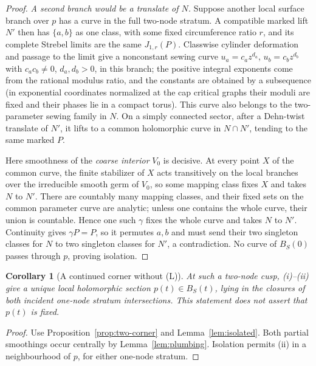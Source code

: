 \documentclass[11pt]{article}
\newtheorem{corollary}[theorem]{Corollary}
\theoremstyle{remark}
\begin{document}
\begin{proof}
\emph{A second branch would be a translate of \(N\).}
Suppose another local surface branch over \(p\) has a curve
in the full two-node stratum. A compatible marked lift
\(N'\) then has \(\{a,b\}\) as one class, with some fixed
circumference ratio \(r\), and its complete Strebel limits are
the same \(J_{1,r}(P)\).
Classwise cylinder deformation and passage to the limit
give a nonconstant sewing curve
\(u_a=c_a z^{d_a}\), \(u_b=c_b z^{d_b}\) with \(c_a c_b\ne0\),
\(d_a,d_b>0\), in this branch; the positive integral exponents come
from the rational modulus ratio, and the constants are obtained
by a subsequence (in exponential coordinates normalized
at the cap critical graphs their moduli are fixed and
their phases lie in a compact torus).
This curve also belongs to the two-parameter sewing family
in \(N\). On a simply connected sector, after a Dehn-twist
translate of \(N'\), it lifts to a common holomorphic curve
in \(N\cap N'\), tending to the same marked \(P\).

Here smoothness of the \emph{coarse interior} \(V_0\) is
decisive. At every point \(X\) of the common curve, the
finite stabilizer of \(X\) acts transitively on the local
branches over the irreducible smooth germ of \(V_0\), so
some mapping class fixes \(X\) and takes \(N\) to \(N'\).
There are countably many mapping classes, and their fixed sets
on the common parameter curve are analytic; unless one
contains the whole curve, their union is countable.
Hence one such \(\gamma\) fixes the whole curve and takes
\(N\) to \(N'\). Continuity gives \(\gamma P=P\), so it permutes
\(a,b\) and must send their two singleton classes for
\(N\) to two singleton classes for \(N'\), a contradiction.
No curve of \(B_S(0)\) passes through \(p\), proving isolation.
\end{proof}

\begin{corollary}[A continued corner without (L)]\label{cor:corner-section}
At such a two-node cusp, (i)--(ii) give a unique local
holomorphic section \(p(t)\in B_S(t)\), lying in the closures
of both incident one-node stratum intersections.
This statement does not assert that \(p(t)\) is fixed.
\end{corollary}
\begin{proof}
Use Proposition~\ref{prop:two-corner} and
Lemma~\ref{lem:isolated}. Both partial smoothings occur centrally
by Lemma~\ref{lem:plumbing}. Isolation permits (ii) in a
neighbourhood of \(p\), for either one-node stratum.
\end{proof}
\end{document}
